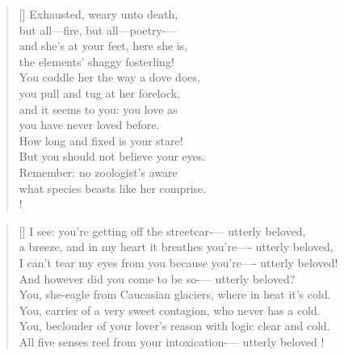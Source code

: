 \documentclass[]{article}
\begin{document}
\settowidth{\versewidth}{Exhausted, weary unto death }
\begin{verse}[\versewidth]
Exhausted, weary unto death,\\
but all—fire, but all—poetry-— \\
and she's at your feet, here she is,\\
the elements' shaggy fosterling!\\
You coddle her the way a dove does,\\
you pull and tug at her forelock,\\
and it seems to you: you love as\\
you have never loved before.\\
How long and fixed is your stare!\\
But you should not believe your eyes.\\
Remember: no zoologist's aware\\
what species beasts like her comprise.\\!
\end{verse}
\newpage

\vspace*{0.03\textheight}
\settowidth{\versewidth}{I see: you're getting off the streetcar—utterly beloved , }
\begin{verse}[\versewidth]
I see: you're getting off the streetcar-— utterly beloved,\\
a breeze, and in my heart it breathes you're—- utterly beloved,\\
I can't tear my eyes from you because you're—-  utterly beloved!\\
And however did you come to be so-— utterly beloved?\\
You, she-eagle from Caucasian glaciers, where in heat it's cold.\\
You, carrier of a very sweet contagion, who never has a cold.\\
You, beclouder of your lover's reason with logic clear and cold.\\
All five senses reel from your intoxication-— utterly beloved !\\
\end{verse}
\bigskip \bigskip
\end{document}
